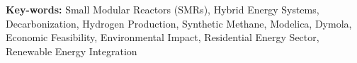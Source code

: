 \vspace{10pt}

\begin{tcolorbox}[arc=0pt, boxrule=0pt, colback=cherenkovblue!60, width=\textwidth, colupper=white]
    {\titlesfont\fontsize{10}{12}\textbf{Key-words:}} Small Modular Reactors (SMRs), Hybrid Energy Systems, Decarbonization, Hydrogen Production, Synthetic Methane, Modelica, Dymola, Economic Feasibility, Environmental Impact, Residential Energy Sector, Renewable Energy Integration
\end{tcolorbox}

\vspace{12pt}

\makenomenclature
\renewcommand\nomgroup[1]{%
\item[\bfseries
\ifstrequal{#1}{A}{Type A}{%
\ifstrequal{#1}{B}{Type B \& Misc}{%
}}%
]}



\renewcommand{\nompreamble}{\begin{multicols}{2}}
\renewcommand{\nompostamble}{\end{multicols}}

\vspace{-5pt} %
\printnomenclature
